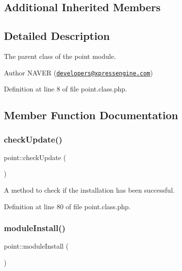 \subsection*{Additional Inherited Members}


\subsection{Detailed Description}
The parent class of the point module. 

\begin{DoxyAuthor}{Author}
N\+A\+V\+ER (\href{mailto:developers@xpressengine.com}{\tt developers@xpressengine.\+com}) 
\end{DoxyAuthor}


Definition at line 8 of file point.\+class.\+php.



\subsection{Member Function Documentation}
\hypertarget{classpoint_a26afa184808e8535aec718cebd34c908}{}\label{classpoint_a26afa184808e8535aec718cebd34c908} 
\subsubsection{\texorpdfstring{check\+Update()}{checkUpdate()}}
{\footnotesize\ttfamily point\+::check\+Update (\begin{DoxyParamCaption}{ }\end{DoxyParamCaption})}



A method to check if the installation has been successful. 



Definition at line 80 of file point.\+class.\+php.

\hypertarget{classpoint_a6f542fa43f0fc00f21eaf36fa0c3f9c0}{}\label{classpoint_a6f542fa43f0fc00f21eaf36fa0c3f9c0} 
\subsubsection{\texorpdfstring{module\+Install()}{moduleInstall()}}
{\footnotesize\ttfamily point\+::module\+Install (\begin{DoxyParamCaption}{ }\end{DoxyParamCaption})}



